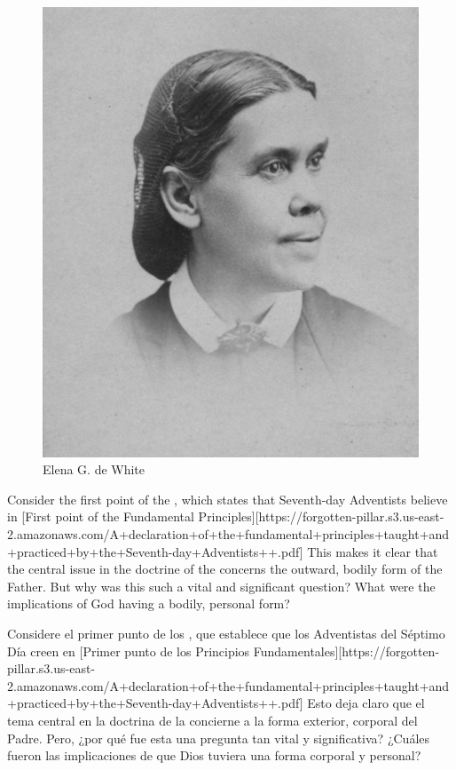 \begin{figure}[t]
    \centering
    \includegraphics[width=0.65\linewidth]{images/ellen-white.jpg}
    \caption*{Elena G. de White}
    \label{fig:ellen-g-white}
\end{figure}


Consider the first point of the , which states that Seventh-day Adventists believe in [First point of the Fundamental Principles][https://forgotten-pillar.s3.us-east-2.amazonaws.com/A+declaration+of+the+fundamental+principles+taught+and+practiced+by+the+Seventh-day+Adventists++.pdf] This makes it clear that the central issue in the doctrine of the  concerns the outward, bodily form of the Father. But why was this such a vital and significant question? What were the implications of God having a bodily, personal form?


Considere el primer punto de los , que establece que los Adventistas del Séptimo Día creen en [Primer punto de los Principios Fundamentales][https://forgotten-pillar.s3.us-east-2.amazonaws.com/A+declaration+of+the+fundamental+principles+taught+and+practiced+by+the+Seventh-day+Adventists++.pdf] Esto deja claro que el tema central en la doctrina de la  concierne a la forma exterior, corporal del Padre. Pero, ¿por qué fue esta una pregunta tan vital y significativa? ¿Cuáles fueron las implicaciones de que Dios tuviera una forma corporal y personal?


